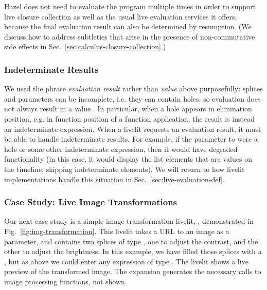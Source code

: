 Hazel does not need to evaluate the program multiple times in order to support live closure collection
as well as the usual live evaluation services it offers, because the final evaluation result 
can also be determined by resumption.
(We discuss how to address subtleties that arise 
in the presence of non-commutative side effects in Sec.~\ref{sec:calculus-closure-collection}.)

\subsubsection{Indeterminate Results}
We used the phrase \emph{evaluation result} rather than \emph{value} above purposefully:
splices and parameters can be incomplete, i.e. they can contain holes, so
evaluation does not always result in a value \cite{HazelnutLive}.
In particular, when a hole appears in elimination position, e.g. in function position of a function application,
 the result is instead an indeterminate expression.
When a livelit requests an evaluation result, it must be able to handle indeterminate results.
For example, if the parameter to  were a hole or some other indeterminate expression,
then it would have degraded functionality
(in this case, it would display the list elements that are values on the timeline, skipping indeterminate elements).
We will return to how livelit implementations handle this situation in Sec.~\ref{sec:live-evaluation-def}.



\subsubsection{Case Study: Live Image Transformations}\label{sec:image-transformation}
Our next case study is a simple image transformation livelit, ,
demonstrated in Fig.~\ref{fig:img-transformation}. This livelit takes 
a URL to an image as a parameter, and contains two splices of type ,
one to adjust the contrast, and the other to adjust the brightness.
In this example, we have filled those splices with a , but 
as above we could enter any expression of type .
The livelit shows a live preview of the transformed image.
The expansion generates the necessary calls to image processing functions, 
not shown.

